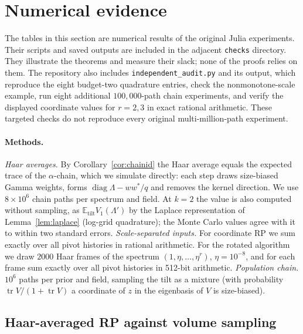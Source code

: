\documentclass[11pt,a4paper]{article}
\theoremstyle{definition}
\newcommand{\E}{\mathbb{E}}
\newcommand{\tr}{\operatorname{tr}}
\newcommand{\diag}{\operatorname{diag}}
\newcommand{\tilt}{\mathrm{tilt}}
\begin{document}
\section{Numerical evidence}\label{sec:numerics}

The tables in this section are numerical results of the original Julia experiments. Their scripts and saved outputs are included in the adjacent \texttt{checks} directory. They illustrate the theorems and measure their slack; none of the proofs relies on them. The repository also includes \texttt{independent\_audit.py} and its output, which reproduce the eight budget-two quadrature entries, check the nonmonotone-scale example, run eight additional $100{,}000$-path chain experiments, and verify the displayed coordinate values for $r=2,3$ in exact rational arithmetic. These targeted checks do not reproduce every original multi-million-path experiment.

\paragraph{Methods.} \emph{Haar averages.} By Corollary~\ref{cor:chainid} the Haar average equals the expected trace of the $\alpha$-chain, which we simulate directly: each step draws size-biased Gamma weights, forms $\diag\Lambda-ww^*/q$ and removes the kernel direction. We use $8\times10^6$ chain paths per spectrum and field. At $k=2$ the value is also computed without sampling, as $\E_\tilt V_1(\Lambda')$ by the Laplace representation of Lemma~\ref{lem:laplace} (log-grid quadrature); the Monte Carlo values agree with it to within two standard errors. \emph{Scale-separated inputs.} For coordinate RP we sum exactly over all pivot histories in rational arithmetic. For the rotated algorithm we draw $2000$ Haar frames of the spectrum $(1,\eta,\dots,\eta^r)$, $\eta=10^{-8}$, and for each frame sum exactly over all pivot histories in 512-bit arithmetic. \emph{Population chain.} $10^6$ paths per prior and field, sampling the tilt as a mixture (with probability $\tr V/(1+\tr V)$ a coordinate of $z$ in the eigenbasis of $V$ is size-biased).

\subsection{Haar-averaged RP against volume sampling}
\end{document}
